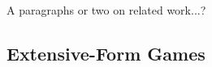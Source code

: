 \documentclass[letterpaper]{article}
\newcounter{vlNoteCounter}
\newcommand{\vlnote}[1]{{\scriptsize \color{blue} $\blacksquare$ \refstepcounter{vlNoteCounter}\textsf{[VL]$_{\arabic{vlNoteCounter}}$:{#1}}}}
\begin{document}

A paragraphs or two on related work...?

\subsection{Extensive-Form Games}
\end{document}
